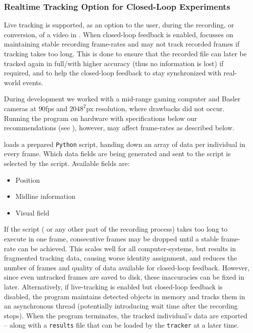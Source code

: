 \documentclass[9pt,lineno]{elife}
\newcommand{\TRex}{\protect\path{TRex}}
\newcommand{\TGrabs}{\protect\path{TGrabs}}
\begin{document}
\subsubsection{Realtime Tracking Option for Closed-Loop Experiments}

Live tracking is supported, as an option to the user, during the recording, or conversion, of a video in \TGrabs{}. When closed-loop feedback is enabled, \TGrabs{} focusses on maintaining stable recording frame-rates and may not track recorded frames if tracking takes too long. This is done to ensure that the recorded file can later be tracked again in full/with higher accuracy (thus no information is lost) if required, and to help the closed-loop feedback to stay synchronized with real-world events.

During development we worked with a mid-range gaming computer and Basler cameras at $90$fps and $2048^2$px resolution, where drawbacks did not occur. {\color{blue} Running the program on hardware with specifications below our recommendations (see ), however, may affect frame-rates as described below.}

\TRex{} loads a prepared \verb!Python! script, handing down an array of data per individual in every frame. Which data fields are being generated and sent to the script is selected by the script. Available fields are:

\begin{itemize}[label=\textnormal{$\bullet$}]
    \item Position
    \item Midline information
    \item Visual field
\end{itemize}

If the script ({\color{blue} or any other part of the recording process}) takes too long to execute {\color{blue} in one} frame, {\color{blue}consecutive frames may be} dropped until a stable frame-rate can be achieved. This scales well for all computer-systems, {\color{blue} but results in fragmented tracking data, causing worse identity assignment, and reduces the number of frames and quality of data available for closed-loop feedback. However, since even untracked frames are saved to disk, these inaccuracies can be fixed in \TRex{} later. Alternatively, if live-tracking is enabled but closed-loop feedback is disabled, the program maintains detected objects in memory and tracks them in an asynchronous thread (potentially introducing wait time after the recording stops).} When the program terminates, the tracked individual's data are exported -- along with a \verb!results! file that can be loaded by the \verb!tracker! at a later time.
\end{document}
